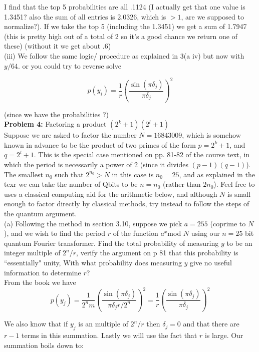 I find that the top 5 probabilities are all .1124 (I actually get that one
value is 1.3451? also the sum of all entries is 2.0326, which is $>1$, are we supposed to
normalize?). If we take the top 5 (including the 1.3451) we get a sum of
1.7947 (this is pretty high out of a total of 2 so it's a good chance we
return one of these) (without it we get about .6)\\

(iii) We follow the same logic/ procedure as explained in 3(a iv) but now
with $y/64$. or you could try to reverse solve

$$p(y_i)=\frac{1}{r}\left(\frac{\sin(\pi\delta_j)}{\pi\delta_j}\right)^2$$

(since we have the probabilities ?)\\


\textbf{Problem 4:} Factoring a product $(2^k+1)(2^l+1)$\\

Suppose we are asked to factor the number $N=16843009$, which is somehow
known in advance to be the product of two primes of the form $p=2^k+1$, and
$q=2^l+1$. This is the special case mentioned on pp. 81-82 of the course
text, in which the period is necessarily a power of 2 (since it divides
$(p-1)(q-1)$). The smallest $n_0$ such that $2^{n_0}>N$ in this case is
$n_0=25$, and as explained in the texr we can take the number of Qbits to be
$n=n_0$ (rather than $2n_0$). Feel free to uses a classical computing aid for
the arithmetic below, and although $N$ is small enough to factor directly by
classical methods, try instead to follow the steps of the quantum argument.\\

(a) Following the method in section 3.10, suppose we pick $a=255$ (coprime to
$N$), and we wish to find the period $r$ of the function $a^x$mod $N$ using our
$n=25$ bit quantum Fourier transformer. Find the total probability of
measuring $y$ to be an integer multiple of $2^n/r$, verify the argument on p 81
that this probability is ``essentially" unity, With what probability does
measuring $y$ give no useful information to determine $r$?\\

From the book we have
$$p(y_j)=\frac{1}{2^nm}\left(\frac{\sin(\pi\delta_j)}{\pi\delta_jr/2^n}\right)^2=\frac{1}{r}\left(\frac{\sin(\pi\delta_j)}{\pi\delta_j}\right)^2$$

We also know that if $y_j$ is an multiple of $2^n/r$ then $\delta_j=0$ and
that there are $r-1$ terms in this summation. Lastly we will use the fact
that $r$ is large. Our summation boils down to:

